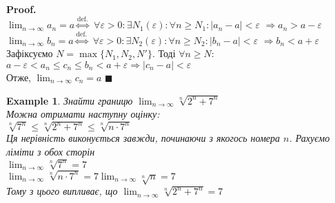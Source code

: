 \documentclass[a4paper, 14pt]{extarticle}
\theoremstyle{theoremdd}
\theoremstyle{theoremdd}
\theoremstyle{theoremdd}
\theoremstyle{theoremdd}
\newtheorem{example}[theorem]{Example}
\theoremstyle{theoremdd}
\theoremstyle{theoremdd}
\theoremstyle{theoremdd}
\theoremstyle{theoremdd}
\newenvironment{pf}{\vspace*{-3mm} \textbf{Proof. \\}}{$\blacksquare$}
\def\limitdef#1#2#3#4#5{$\displaystyle \forall #1 > 0: \exists #2(#1): \forall #3 \geq #2: \left|#4 - #5\right| < #1$}
\begin{document}
	\begin{pf}
	$\displaystyle \lim_{n \to \infty} a_n = a \overset{\textrm{def.}}{\iff}$ \limitdef{\varepsilon}{N_1}{n}{a_n}{a} $\Rightarrow a_n > a - \varepsilon$\\
	$\displaystyle \lim_{n \to \infty} b_n = a \overset{\textrm{def.}}{\iff}$ \limitdef{\varepsilon}{N_2}{n}{b_n}{a} $\Rightarrow b_n<a+\varepsilon$\\
	Зафіксуємо $N=\max\{N_1, N_2, N'\}$. Тоді $\forall n \geq N:$\\
	$a-\varepsilon< a_n \leq c_n \leq b_n < a+\varepsilon \Rightarrow |c_n - a|<\varepsilon$\\
	Отже, $\displaystyle \lim_{n \to \infty} c_n = a$
	\end{pf}
	
	\begin{example}
	Знайти границю $\displaystyle \lim_{n \to \infty} \sqrt[n]{2^n+7^n}$\\
	Можна отримати наступну оцінку:\\
	$\sqrt[n]{7^n} \leq \sqrt[n]{2^n+7^n} \leq \sqrt[n]{n\cdot 7^n}$\\
	Ця нерівність виконується завжди, починаючи з якогось номера $n$. Рахуємо ліміти з обох сторін\\
	$\displaystyle \lim_{n \to \infty} \sqrt[n]{7^n} = 7$\\
	$\displaystyle \lim_{n \to \infty} \sqrt[n]{n \cdot 7^n} = 7 \lim_{n \to \infty} \sqrt[n]{n} = 7$\\
	Тому з цього випливає, що $\displaystyle \lim_{n \to \infty} \sqrt[n]{2^n+7^n} = 7$
	\end{example}
	
\end{document}
